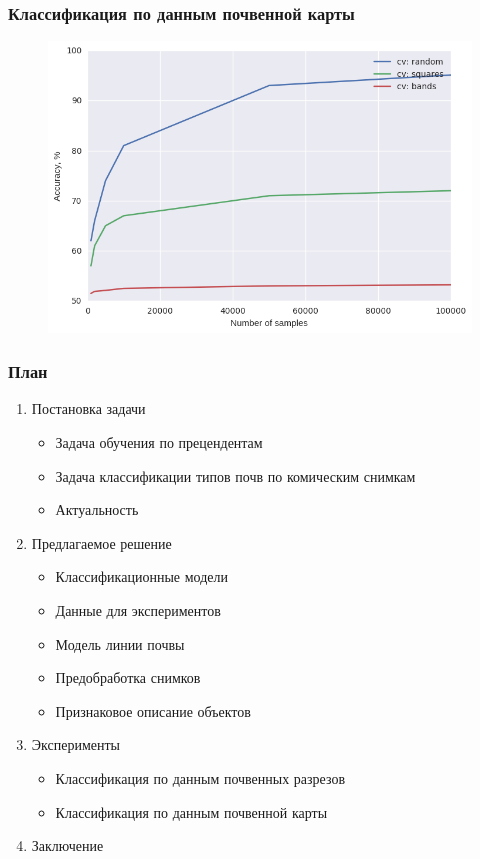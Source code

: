 \documentclass{beamer}
\begin{document}
\begin{frame}
\frametitle{Классификация по данным почвенной карты}
\begin{figure}[H]
\centering
\includegraphics[width=0.8\linewidth]{imgs/map_validations_9_classes.png}
\end{figure}
\end{frame}

\begin{frame}
\frametitle{План}
\begin{enumerate}
    \item Постановка задачи
        \begin{itemize}
            \item Задача обучения по прецендентам
            \item Задача классификации типов почв по комическим снимкам
            \item Актуальность
        \end{itemize}
    \item Предлагаемое решение
    \begin{itemize}
        \item Классификационные модели
        \item Данные для экспериментов
        \item Модель линии почвы
        \item Предобработка снимков
        \item Признаковое описание объектов
    \end{itemize}
    \item Эксперименты
    \begin{itemize}
        \item Классификация по данным почвенных разрезов
        \item Классификация по данным почвенной карты
    \end{itemize}
    \item {\color{blue} Заключение}
\end{enumerate}
\end{frame}
\end{document}
